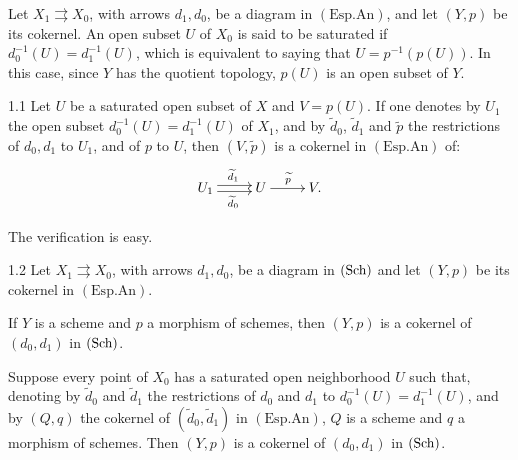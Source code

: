Let $X_1\rightrightarrows X_0$, with arrows $d_1,d_0$, be a diagram in $(\mathrm{Esp.An})$, and let $(Y,p)$ be its cokernel. An open subset $U$ of $X_0$ is said to be saturated if $d_0^{-1}(U)=d_1^{-1}(U)$, which is equivalent to saying that $U=p^{-1}(p(U))$. In this case, since $Y$ has the quotient topology, $p(U)$ is an open subset of $Y$.
\begin{lemma}{1.1}\label{V.1.1}
Let $U$ be a saturated open subset of $X$ and $V=p(U)$. If one denotes by $U_1$ the open subset $d_0^{-1}(U)=d_1^{-1}(U)$ of $X_1$, and by $\widetilde d_0$, $\widetilde d_1$ and $\widetilde p$ the restrictions of $d_0,d_1$ to $U_1$, and of $p$ to $U$, then $(V,\widetilde p)$ is a cokernel in $(\mathrm{Esp.An})$ of:
\[
\xymatrix{U_1\ar@<.5ex>[r]^{\widetilde d_1}\ar@<-.5ex>[r]_{\widetilde d_0}&U\ar[r]^{\widetilde p}&V.}
\]
\end{lemma}
The verification is easy.
\begin{lemma}{1.2}\label{V.1.2}
Let $X_1\rightrightarrows X_0$, with arrows $d_1,d_0$, be a diagram in $\textup{(Sch)}$ and let $(Y,p)$ be its cokernel in $(\mathrm{Esp.An})$.
\begin{enumeratei}
\item If $Y$ is a scheme and $p$ a morphism of schemes, then $(Y,p)$ is a cokernel of $(d_0,d_1)$ in $\textup{(Sch)}$.
\item Suppose every point of $X_0$ has a saturated open neighborhood $U$ such that, denoting by $\widetilde d_0$ and $\widetilde d_1$ the restrictions of $d_0$ and $d_1$ to $d_0^{-1}(U)=d_1^{-1}(U)$, and by $(Q,q)$ the cokernel of $(\widetilde d_0,\widetilde d_1)$ in $(\mathrm{Esp.An})$, $Q$ is a scheme and $q$ a morphism of schemes. Then $(Y,p)$ is a cokernel of $(d_0,d_1)$ in $\textup{(Sch)}$.
\end{enumeratei}
\end{lemma}
